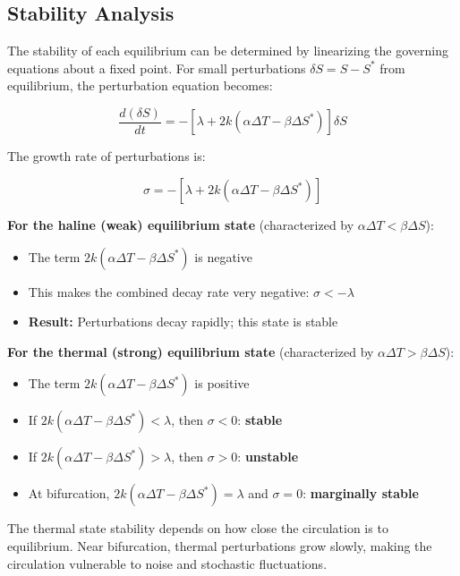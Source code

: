 \documentclass[12pt,letterpaper]{article}
\begin{document}
\subsection{Stability Analysis}

The stability of each equilibrium can be determined by linearizing the governing equations about a fixed point. For small perturbations $\delta S = S - S^*$ from equilibrium, the perturbation equation becomes:

\begin{equation}
\frac{d(\delta S)}{dt} = -\left[\lambda + 2k(\alpha\Delta T - \beta\Delta S^*)\right]\delta S
\end{equation}

The growth rate of perturbations is:

\begin{equation}
\sigma = -\left[\lambda + 2k(\alpha\Delta T - \beta\Delta S^*)\right]
\end{equation}

\noindent \textbf{For the haline (weak) equilibrium state} (characterized by $\alpha\Delta T < \beta\Delta S$):
\begin{itemize}
\item The term $2k(\alpha\Delta T - \beta\Delta S^*)$ is negative
\item This makes the combined decay rate very negative: $\sigma < -\lambda$
\item \textbf{Result:} Perturbations decay rapidly; this state is stable
\end{itemize}

\noindent \textbf{For the thermal (strong) equilibrium state} (characterized by $\alpha\Delta T > \beta\Delta S$):
\begin{itemize}
\item The term $2k(\alpha\Delta T - \beta\Delta S^*)$ is positive
\item If $2k(\alpha\Delta T - \beta\Delta S^*) < \lambda$, then $\sigma < 0$: \textbf{stable}
\item If $2k(\alpha\Delta T - \beta\Delta S^*) > \lambda$, then $\sigma > 0$: \textbf{unstable}
\item At bifurcation, $2k(\alpha\Delta T - \beta\Delta S^*) = \lambda$ and $\sigma = 0$: \textbf{marginally stable}
\end{itemize}

The thermal state stability depends on how close the circulation is to equilibrium. Near bifurcation, thermal perturbations grow slowly, making the circulation vulnerable to noise and stochastic fluctuations.
\end{document}
